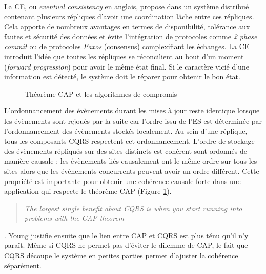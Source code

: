La \gls{CE}, ou \textit{eventual consistency} en anglais, propose dans un système 
distribué contenant plusieurs répliques d'avoir une coordination lâche entre ces 
répliques. Cela apporte de nombreux avantages en termes de disponibilité, 
tolérance aux fautes et sécurité des données et évite l'intégration de protocoles comme \textit{2 
phase commit} ou de protocoles \textit{Paxos} (consensus) complexifiant les échanges. 
La \gls{CE} introduit l'idée que toutes les répliques se réconcilient au bout d'un 
moment (\textit{forward progression}) pour avoir le même état final. Si le caractère 
vicié d'une information est détecté, le système doit le \og réparer\fg{} pour obtenir 
le bon état. 
\begin{figure} [ht]
	\centering
	\caption{Théorème CAP et les algorithmes de compromis}
	\label{fig:cap}
\end{figure}
L'ordonnancement des évènements durant les mises à jour reste identique lorsque
les évènements sont rejoués par la suite car l'ordre issu de l'\gls{ES} est 
déterminée par l'ordonnancement des évènements stockés 
localement. Au sein d'une réplique, tous les composants \gls{CQRS} respectent 
cet ordonnancement. L’ordre de stockage des évènements répliqués sur des sites 
distincts est cohérent sont ordonnés de manière causale \cite{Lamport1978} : les 
évènements liés causalement ont le même ordre sur tous les sites alors que les 
évènements concurrents peuvent avoir un ordre différent. Cette propriété est 
importante pour obtenir une cohérence causale forte dans une application qui 
respecte le théorème \gls{CAP} (Figure \ref{fig:cap}).  \blockquote[]{	\textit{The 
largest single 
benefit about 
CQRS is when 
		you start running into 
		problems 
		with the CAP theorem}}{
	\cite{Young2010}
}.
Young justifie ensuite que le lien entre \gls{CAP} et \gls{CQRS} est plus ténu qu'il 
n'y paraît. Même si \gls{CQRS} ne permet pas d'éviter le dilemme de \gls{CAP}, le 
fait que \gls{CQRS} découpe le système en petites parties permet d'ajuster la 
cohérence séparément.

